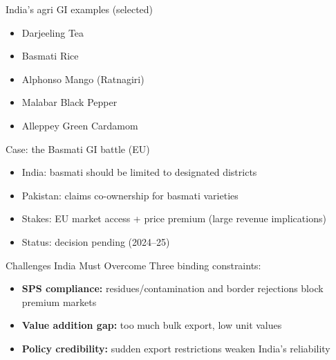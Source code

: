 \documentclass[
  ignorenonframetext,
  aspectratio=169,
]{beamer}
\makeatletter
\providecommand{\tightlist}{%
  \setlength{\itemsep}{0pt}\setlength{\parskip}{0pt}}
\let\quarto@originallabel\label
\DeclareRobustCommand*{\label}[1]{\quarto@originallabel{#1}}
\makeatother
\begin{document}
\begin{frame}
\begin{block}{India's agri GI examples (selected)}
\label{indias-agri-gi-examples-selected}
\begin{itemize}
\tightlist
\item
  Darjeeling Tea
\item
  Basmati Rice
\item
  Alphonso Mango (Ratnagiri)
\item
  Malabar Black Pepper
\item
  Alleppey Green Cardamom
\end{itemize}

\end{block}
\end{frame}

\begin{frame}
\begin{block}{Case: the Basmati GI battle (EU)}
\label{case-the-basmati-gi-battle-eu}
\begin{itemize}
\tightlist
\item
  India: basmati should be limited to designated districts
\item
  Pakistan: claims co-ownership for basmati varieties
\item
  Stakes: EU market access + price premium (large revenue implications)
\item
  Status: decision pending (2024--25)
\end{itemize}
\end{block}
\end{frame}

\begin{frame}
\begin{block}{Challenges India Must Overcome}
\label{challenges-india-must-overcome}
Three binding constraints:

\begin{itemize}
\tightlist
\item
  \textbf{SPS compliance:} residues/contamination and border rejections
  block premium markets
\item
  \textbf{Value addition gap:} too much bulk export, low unit values
\item
  \textbf{Policy credibility:} sudden export restrictions weaken India's
  reliability
\end{itemize}

\end{block}
\end{frame}
\end{document}
